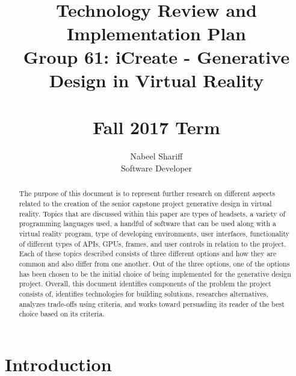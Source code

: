 \documentclass[letterpaper,10pt,onecolumn,compsoc]{IEEEtran}
\title{
  ~ \\ ~ \\ ~ \\ ~ \\ ~ \\ ~ \\ ~ \\ 
  Technology Review and Implementation Plan \\ \bigskip
  \large
  Group 61: iCreate - Generative Design in Virtual Reality \\ ~ \\
  Fall 2017 Term}
\author{\leavevmode\rlap{Rhea Mae Edwards}\hfill{Nabeel Shariff}\hfill\llap{Hannah Solorzano}\\\leavevmode\rlap{Software Developer}\hfill{Software Developer}\hfill\llap{Software Developer}}
\begin{document}
\maketitle

\vfill

\begin{abstract}


\noindent
The purpose of this document is to represent further research on different aspects related to the creation of the senior capstone project generative design in virtual reality. Topics that are discussed within this paper are types of headsets, a variety of programming languages used, a handful of software that can be used along with a virtual reality program, type of developing environments, user interfaces, functionality of different types of APIs, GPUs, frames, and user controls in relation to the project. Each of these topics described consists of three different options and how they are common and also differ from one another. Out of the three options, one of the options has been chosen to be the initial choice of being implemented for the generative design project. Overall, this document identifies components of the problem the project consists of, identifies technologies for building solutions, researches alternatives, analyzes trade-offs using criteria, and works toward persuading its reader of the best choice based on its criteria.

\end{abstract}

\newpage


\tableofcontents

\newpage

\section{Introduction}
\end{document}
